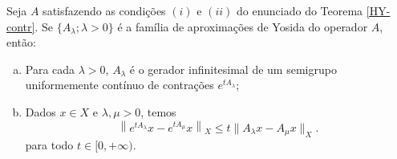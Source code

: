 \begin{lemma}\label{Plem3.4}
Seja $A$ satisfazendo as condições $(i)$ e $(ii)$ do enunciado do Teorema \ref{HY-contr}. Se $\{ A_\lambda ; \lambda >0 \}$ é a família de aproximações de Yosida do operador $A$, então:
\begin{enumerate}[(a)]
    \item Para cada $\lambda >0$, $A_\lambda$ é o gerador infinitesimal de um semigrupo uniformemente contínuo de contrações $e^{tA_\lambda}$;
    \item Dados $x\in X$ e $\lambda,\mu>0$, temos
\begin{equation*}
\left\|e^{tA_\lambda}x-e^{tA_\mu}x\right\|_X \leq t\|A_\lambda x-A_\mu x\|_X .
\end{equation*}
para todo $t\in [0,+\infty )$.
\end{enumerate}
\end{lemma}
